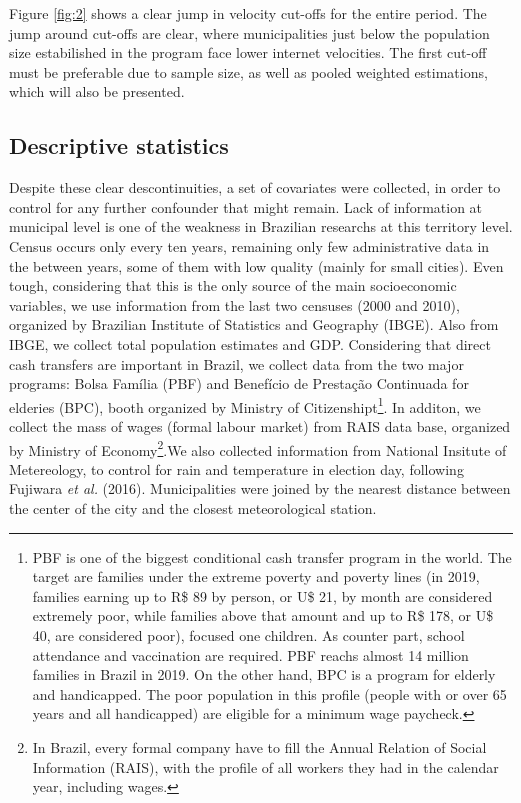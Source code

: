 \documentclass[12pt,]{article}
\let\rmarkdownfootnote\footnote%
\def\footnote{\protect\rmarkdownfootnote}
\begin{document}
Figure \ref{fig:2} shows a clear jump in velocity cut-offs for the
entire period. The jump around cut-offs are clear, where municipalities
just below the population size estabilished in the program face lower
internet velocities. The first cut-off must be preferable due to sample
size, as well as pooled weighted estimations, which will also be
presented.

\hypertarget{descriptive-statistics}{%
\subsection{Descriptive statistics}\label{descriptive-statistics}}

Despite these clear descontinuities, a set of covariates were collected,
in order to control for any further confounder that might remain. Lack
of information at municipal level is one of the weakness in Brazilian
researchs at this territory level. Census occurs only every ten years,
remaining only few administrative data in the between years, some of
them with low quality (mainly for small cities). Even tough, considering
that this is the only source of the main socioeconomic variables, we use
information from the last two censuses (2000 and 2010), organized by
Brazilian Institute of Statistics and Geography (IBGE). Also from IBGE,
we collect total population estimates and GDP. Considering that direct
cash transfers are important in Brazil, we collect data from the two
major programs: Bolsa Família (PBF) and Benefício de Prestação
Continuada for elderies (BPC), booth organized by Ministry of
Citizenshipt\footnote{PBF is one of the biggest conditional cash
  transfer program in the world. The target are families under the
  extreme poverty and poverty lines (in 2019, families earning up to R\$
  89 by person, or U\$ 21, by month are considered extremely poor, while
  families above that amount and up to R\$ 178, or U\$ 40, are
  considered poor), focused one children. As counter part, school
  attendance and vaccination are required. PBF reachs almost 14 million
  families in Brazil in 2019. On the other hand, BPC is a program for
  elderly and handicapped. The poor population in this profile (people
  with or over 65 years and all handicapped) are eligible for a minimum
  wage paycheck.}. In additon, we collect the mass of wages (formal
labour market) from RAIS data base, organized by Ministry of
Economy\footnote{In Brazil, every formal company have to fill the Annual
  Relation of Social Information (RAIS), with the profile of all workers
  they had in the calendar year, including wages.}.We also collected
information from National Insitute of Metereology, to control for rain
and temperature in election day, following Fujiwara \emph{et al.}
(2016). Municipalities were joined by the nearest distance between the
center of the city and the closest meteorological station.
\end{document}
